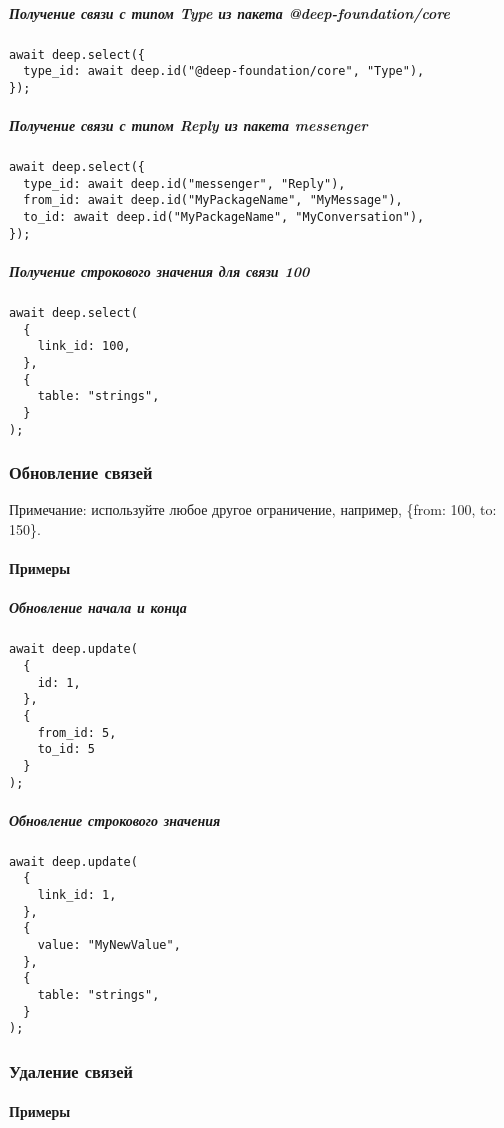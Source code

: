 \documentclass{article}
\begin{document}
\subparagraph{Получение связи с типом Type из пакета @deep-foundation/core}
\begin{lstlisting}
await deep.select({
  type_id: await deep.id("@deep-foundation/core", "Type"),
});
\end{lstlisting}

\subparagraph{Получение связи с типом Reply из пакета messenger}
\begin{lstlisting}
await deep.select({
  type_id: await deep.id("messenger", "Reply"),
  from_id: await deep.id("MyPackageName", "MyMessage"),
  to_id: await deep.id("MyPackageName", "MyConversation"),
});
\end{lstlisting}

\subparagraph{Получение строкового значения для связи 100}
\begin{lstlisting}
await deep.select(
  {
    link_id: 100,
  },
  {
    table: "strings",
  }
);
\end{lstlisting}

\subsubsection{Обновление связей}

Примечание: используйте любое другое ограничение, например, \{from: 100, to:
150\}.

\paragraph{Примеры}

\subparagraph{Обновление начала и конца}
\begin{lstlisting}
await deep.update(
  {
    id: 1,
  },
  {
    from_id: 5,
    to_id: 5
  }
);
\end{lstlisting}

\subparagraph{Обновление строкового значения}
\begin{lstlisting}
await deep.update(
  {
    link_id: 1,
  },
  {
    value: "MyNewValue",
  },
  {
    table: "strings",
  }
);
\end{lstlisting}

\subsubsection{Удаление связей}

\paragraph{Примеры}
\end{document}
